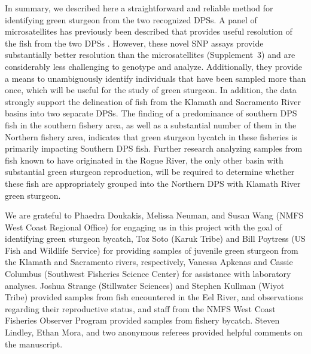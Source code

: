 \documentclass[twocolumn,natbib]{svjour3}       %
\begin{document}
In summary, we described here a straightforward and reliable method for identifying
green sturgeon from the two recognized DPSs. A panel of microsatellites
has previously been described that provides useful resolution of
the fish from the two DPSs \citep{Israeletal2009}. However, these novel SNP assays provide substantially 
better resolution than the microsatellites (Supplement~3) 
and are considerably less challenging to genotype and analyze. 
Additionally, they provide a means to unambiguously identify individuals that have been 
sampled more than once, which will be useful for the study of green sturgeon. In addition, 
the data strongly support the delineation of fish from the Klamath and Sacramento River 
basins into two separate DPSs. 
The finding of a predominance of southern DPS fish in the southern fishery area, as well as a substantial number of them in the Northern fishery area, indicates that green sturgeon bycatch in these fisheries is primarily impacting Southern DPS fish. 
Further research analyzing samples from fish known to have 
originated in the Rogue River, the only other basin with substantial green sturgeon 
reproduction, will be required to determine whether these fish are appropriately 
grouped into the Northern DPS with Klamath River green sturgeon. 









\begin{acknowledgements}
We are grateful to Phaedra Doukakis, Melissa Neuman, and Susan Wang (NMFS West Coast Regional Office) for engaging us in this project with the goal of identifying green sturgeon bycatch, Toz Soto (Karuk Tribe) and Bill Poytress (US Fish and Wildlife Service) for providing samples of juvenile green sturgeon from the Klamath and Sacramento rivers, respectively, Vanessa Apkenas and Cassie Columbus (Southwest Fisheries Science Center) for assistance with laboratory analyses. Joshua Strange (Stillwater Sciences) and Stephen Kullman (Wiyot Tribe) provided samples from fish encountered in the Eel River, and observations regarding their reproductive status, and staff from the NMFS West Coast Fisheries Observer Program provided samples from fishery bycatch. Steven Lindley, Ethan Mora, and two anonymous referees provided helpful comments on the manuscript.
\end{acknowledgements}


\end{document}

